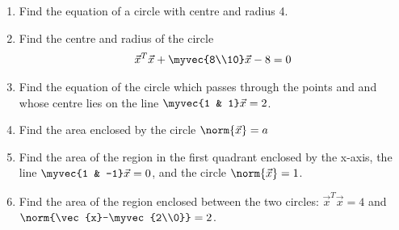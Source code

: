 \renewcommand{\theequation}{\theenumi}
\begin{enumerate}[label=\arabic*.,ref=\thesubsection.\theenumi]
\item Find the equation of a circle with centre  and radius 4.
\item Find the centre and radius of the circle
\begin{align}
\vec{x}^T\vec{x}+\myvec{8\\10}\vec{x} -8= 0
\end{align}
%
\item Find the equation of the circle which passes through the points  and  and whose centre lies on the line $\myvec{1 & 1} \vec{x} = 2$.
\item Find the area enclosed by the circle $\norm{\vec{x}} = a$
%
\item Find the area of the region in the first quadrant enclosed by the x-axis, the line $\myvec{1 & -1}\vec{x} = 0$, and the circle $\norm{\vec{x}} = 1$.
%
\item Find the area of the region enclosed between the two circles: $\vec{x}^T\vec{x} = 4$ and $\norm{\vec{x}-\myvec{2\\0}} = 2$.

\end{enumerate}
